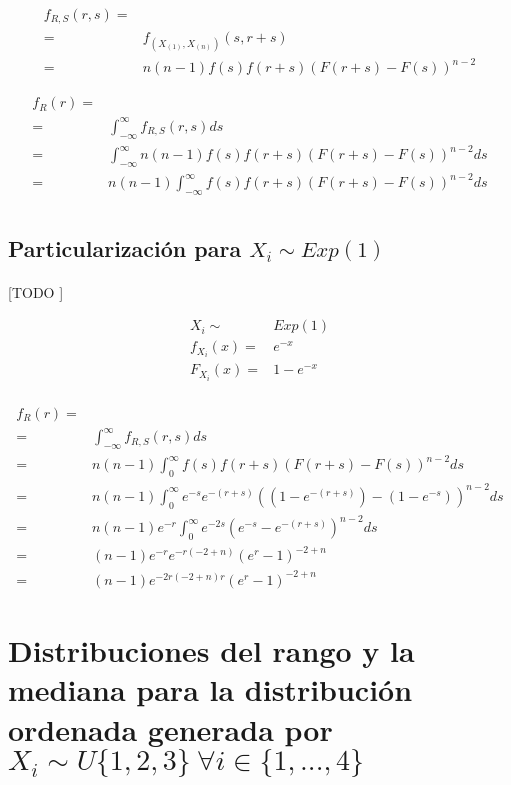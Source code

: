 \documentclass{article}
\begin{document}
    \begin{align}
      f_{R,S}(r,s) =& \\
      =& f_{(X_{(1)}, X_{(n)})} (s,r+s) \\
      =& n(n-1)f(s)f(r+s)(F(r+s) - F(s))^{n-2}
    \end{align}

    \begin{align}
      f_{R} (r) =& \\
      =& \int_{-\infty}^{\infty} f_{R,S}(r,s) ds \\
      =& \int_{-\infty}^{\infty} n(n-1)f(s)f(r+s)(F(r+s) - F(s))^{n-2} ds \\
      =& n(n-1)\int_{-\infty}^{\infty} f(s)f(r+s)(F(r+s) - F(s))^{n-2} ds \\
    \end{align}
    \subsection{Particularización para $X_i \sim Exp(1)$}

      \paragraph{}
      [TODO ]

      \begin{align}
        X_i \sim& Exp(1)\\
        f_{X_{i}}(x) =& e^{-x}\\
        F_{X_{i}}(x) =& 1-e^{-x} \\
      \end{align}

      \begin{align}
        f_{R} (r) =&\\
        =& \int_{-\infty}^{\infty} f_{R,S}(r,s) ds \\
        =& n(n-1)\int_{0}^{\infty} f(s)f(r+s)(F(r+s) - F(s))^{n-2} ds \\
        =& n(n-1)\int_{0}^{\infty} e^{-s}e^{-(r+s)}((1-e^{-(r+s)}) - (1-e^{-s}))^{n-2} ds \\
        =& n(n-1)e^{-r}\int_{0}^{\infty} e^{-2s}( e^{-s} - e^{-(r+s)})^{n-2} ds \\
        =& (n-1)e^{-r}e^{-r(-2 + n)} (e^r -1)^{-2 + n} \\
        =& (n-1)e^{-2r(-2 + n) r} (e^r -1)^{-2 + n}
      \end{align}

  \section{Distribuciones del rango y la mediana para la distribución ordenada generada por $X_i \sim U\{1,2,3\} \ \forall i  \in \{1,...,4\}$}
  \label{sec:e3}
\end{document}
